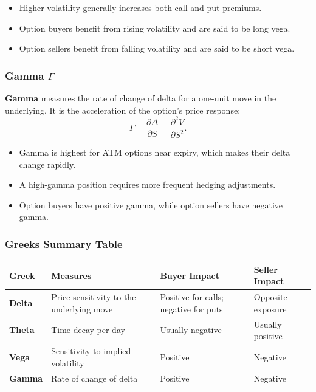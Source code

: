 \documentclass[12pt,openany]{book}
\begin{document}
\begin{itemize}[leftmargin=*]
    \item Higher volatility generally increases both call and put premiums.
    \item Option buyers benefit from rising volatility and are said to be long vega.
    \item Option sellers benefit from falling volatility and are said to be short vega.
\end{itemize}

\subsubsection{Gamma \(\Gamma\)}

\textbf{Gamma} measures the rate of change of delta for a one-unit move in the underlying. It is the acceleration of the option's price response:
\begin{equation*}
    \Gamma = \frac{\partial \Delta}{\partial S} = \frac{\partial^2 V}{\partial S^2}.
\end{equation*}

\begin{itemize}[leftmargin=*]
    \item Gamma is highest for ATM options near expiry, which makes their delta change rapidly.
    \item A high-gamma position requires more frequent hedging adjustments.
    \item Option buyers have positive gamma, while option sellers have negative gamma.
\end{itemize}

\subsubsection{Greeks Summary Table}

\begin{center}
\scriptsize
\setlength{\tabcolsep}{3pt}
\begin{tabular}{|L{2.15cm}|L{4.45cm}|L{3.05cm}|L{3.05cm}|}
\hline
\textbf{Greek} & \textbf{Measures} & \textbf{Buyer Impact} & \textbf{Seller Impact} \\
\hline
\textbf{Delta} & Price sensitivity to the underlying move & Positive for calls; negative for puts & Opposite exposure \\
\hline
\textbf{Theta} & Time decay per day & Usually negative & Usually positive \\
\hline
\textbf{Vega} & Sensitivity to implied volatility & Positive & Negative \\
\hline
\textbf{Gamma} & Rate of change of delta & Positive & Negative \\
\hline
\end{tabular}
\end{center}
\end{document}
